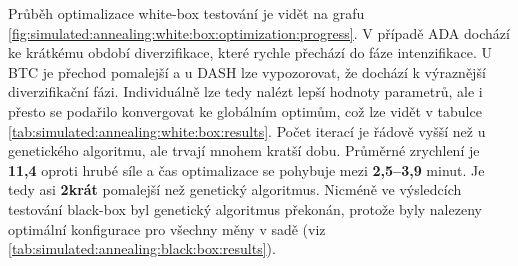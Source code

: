 \begin{table}[!htbp]
\centering
\caption[Nejlepší nalezené nastavení pro sadu white-box pro simulované ochlazování]{~Nejlepší nalezené nastavení pro sadu white-box pro simulované ochlazování}
\label{tab:simulated:annealing:setting}
\end{table}

Průběh optimalizace white-box testování je vidět na grafu \ref{fig:simulated:annealing:white:box:optimization:progress}.
V případě ADA dochází ke krátkému období diverzifikace, které rychle přechází do fáze intenzifikace.
U BTC je přechod pomalejší a u DASH lze vypozorovat, že dochází k výraznější diverzifikační fázi.
Individuálně lze tedy nalézt lepší hodnoty parametrů, ale i přesto se podařilo konvergovat ke globálním optimům, což lze vidět v tabulce \ref{tab:simulated:annealing:white:box:results}.
Počet iterací je řádově vyšší než u genetického algoritmu, ale trvají mnohem kratší dobu.
Průměrné zrychlení je \textbf{11,4} oproti hrubé síle a čas optimalizace se pohybuje mezi \textbf{2,5--3,9} minut.
Je tedy asi \textbf{2krát} pomalejší než genetický algoritmus.
Nicméně ve výsledcích testování black-box byl genetický algoritmus překonán, protože byly nalezeny optimální konfigurace pro všechny měny v sadě (viz \ref{tab:simulated:annealing:black:box:results}).

